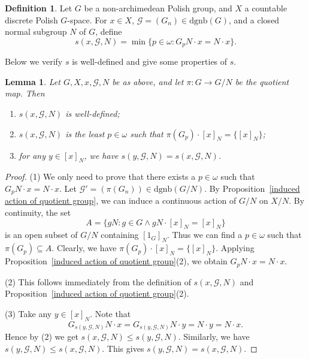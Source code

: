 \documentclass[11pt]{amsart}
\newtheorem{lemma}[theorem]{Lemma}
\theoremstyle{definition}
\newtheorem{definition}[theorem]{Definition}
\theoremstyle{remark}
\numberwithin{equation}{section}
\def\dgnb{{\mathrm{dgnb}}}
\begin{document}
\begin{definition}\label{definition of sxgn}
Let $G$ be a non-archimedean Polish group, and $X$ a countable discrete Polish $G$-space. For $x\in X$, $\mathcal{G}=(G_n)\in\dgnb(G)$, and a closed normal subgroup $N$ of $G$, define
$$s(x,\mathcal{G},N)=\min\{p\in\omega:G_pN\cdot x=N\cdot x\}.$$
\end{definition}
Below we verify $s$ is well-defined and give some properties of $s$.

\begin{lemma}\label{property of sxgn}
Let $G,X,x,\mathcal{G},N$ be as above, and let $\pi:G\to G/N$ be the quotient map. Then
\begin{enumerate}
    \item $s(x,\mathcal{G},N)$ is well-defined;
    \item $s(x,\mathcal{G},N)$ is the least $p\in\omega$ such that $\pi(G_p)\cdot [x]_N=\{[x]_N\}$;
    \item for any $y\in [x]_N$, we have $s(y,\mathcal{G},N)=s(x,\mathcal{G},N)$.
\end{enumerate}
\end{lemma}

\begin{proof}
    (1) We only need to prove that there exists a $p\in\omega$ such that $G_pN\cdot x=N\cdot x$. Let $\mathcal{G}'=(\pi(G_n))\in\dgnb(G/N)$. By Proposition~\ref{induced action of quotient group}, we can induce a continuous action of $G/N$ on $X/N$. By continuity, the set
    $$A=\{gN:g\in G\land gN\cdot[x]_N=[x]_N\}$$
    is an open subset of $G/N$ containing $[1_G]_N$. Thus we can find a $p\in\omega$ such that $\pi(G_p)\subseteq A$. Clearly, we have $\pi(G_p)\cdot[x]_N=\{[x]_N\}$. Applying Proposition~\ref{induced action of quotient group}(2), we obtain $G_pN\cdot x=N\cdot x$.

    (2) This follows immediately from the definition of $s(x,\mathcal{G},N)$ and Proposition~\ref{induced action of quotient group}(2).

    (3) Take any $y\in[x]_N$. Note that
    $$G_{s(y,\mathcal{G},N)}N\cdot x=G_{s(y,\mathcal{G},N)}N\cdot y=N \cdot y=N\cdot x.$$
    Hence by (2) we get $s(x,\mathcal{G},N)\leq s(y,\mathcal{G},N)$. Similarly, we have $s(y,\mathcal{G},N)\leq s(x,\mathcal{G},N)$. This gives $s(y,\mathcal{G},N)=s(x,\mathcal{G},N)$.
\end{proof}
\end{document}
